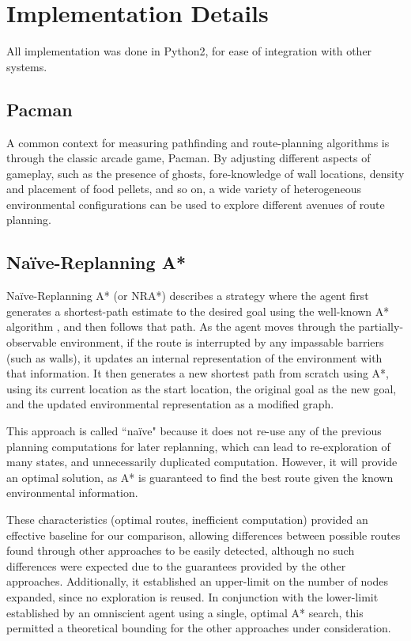 
\section{Implementation Details}\label{sec:implementation}

	All implementation was done in Python2, for ease of integration with other systems. 

\subsection{Pacman}

	A common context for measuring pathfinding and route-planning algorithms is through the classic arcade game, Pacman. By adjusting different aspects of gameplay, such as the presence of ghosts, fore-knowledge of wall locations, density and placement of food pellets, and so on, a wide variety of heterogeneous environmental configurations can be used to explore different avenues of route planning.
	
	

\subsection{Naïve-Replanning A*}

	Naïve-Replanning A* (or NRA*) describes a strategy where the agent first generates a shortest-path estimate to the desired goal using the well-known A* algorithm \cite{hart1968formal}, and then follows that path. As the agent moves through the partially-observable environment, if the route is interrupted by any impassable barriers (such as walls), it updates an internal representation of the environment with that information. It then generates a new shortest path from scratch using A*, using its current location as the start location, the original goal as the new goal, and the updated environmental representation as a modified graph.
	
	This approach is called ``naïve" because it does not re-use any of the previous planning computations for later replanning, which can lead to re-exploration of many states, and unnecessarily duplicated computation. However, it will provide an optimal solution, as A* is guaranteed to find the best route given the known environmental information.
	
	These characteristics (optimal routes, inefficient computation) provided an effective baseline for our comparison, allowing differences between possible routes found through other approaches to be easily detected, although no such differences were expected due to the guarantees provided by the other approaches. Additionally, it established an upper-limit on the number of nodes expanded, since no exploration is reused. In conjunction with the lower-limit established by an omniscient agent using a single, optimal A* search, this permitted a theoretical bounding for the other approaches under consideration.

